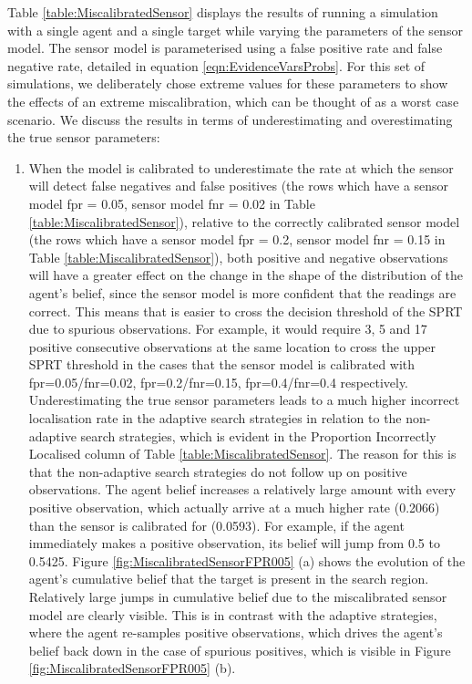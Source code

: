 Table \ref{table:MiscalibratedSensor} displays the results of running a simulation with a single agent and a single target while varying the parameters of the sensor model. The sensor model is parameterised using a false positive rate and false negative rate, detailed in equation \ref{eqn:EvidenceVarsProbs}. For this set of simulations, we deliberately chose extreme values for these parameters to show the effects of an extreme miscalibration, which can be thought of as a worst case scenario. We discuss the results in terms of underestimating and overestimating the true sensor parameters:
\begin{enumerate}
    \item When the model is calibrated to underestimate the rate at which the sensor will detect false negatives and false positives (the rows which have a sensor model fpr = 0.05, sensor model fnr = 0.02 in Table \ref{table:MiscalibratedSensor}), relative to the correctly calibrated sensor model (the rows which have a sensor model fpr = 0.2, sensor model fnr = 0.15 in Table \ref{table:MiscalibratedSensor}), both positive and negative observations will have a greater effect on the change in the shape of the distribution of the agent's belief, since the sensor model is more confident that the readings are correct. This means that is easier to cross the decision threshold of the SPRT due to spurious observations. For example, it would require 3, 5 and 17 positive consecutive observations at the same location to cross the upper SPRT threshold in the cases that the sensor model is calibrated with fpr=0.05/fnr=0.02, fpr=0.2/fnr=0.15, fpr=0.4/fnr=0.4 respectively.
    Underestimating the true sensor parameters leads to a much higher incorrect localisation rate in the adaptive search strategies in relation to the non-adaptive search strategies, which is evident in the Proportion Incorrectly Localised column of Table \ref{table:MiscalibratedSensor}. The reason for this is that the non-adaptive search strategies do not follow up on positive observations. The agent belief increases a relatively large amount with every positive observation, which actually arrive at a much higher rate (0.2066) than the sensor is calibrated for (0.0593). For example, if the agent immediately makes a positive observation, its belief will jump from 0.5 to 0.5425. Figure \ref{fig:MiscalibratedSensorFPR005} (a) shows the evolution of the agent's cumulative belief that the target is present in the search region. Relatively large jumps in cumulative belief due to the miscalibrated sensor model are clearly visible. This is in contrast with the adaptive strategies, where the agent re-samples positive observations, which drives the agent's belief back down in the case of spurious positives, which is visible in Figure \ref{fig:MiscalibratedSensorFPR005} (b).
    

\end{enumerate}

